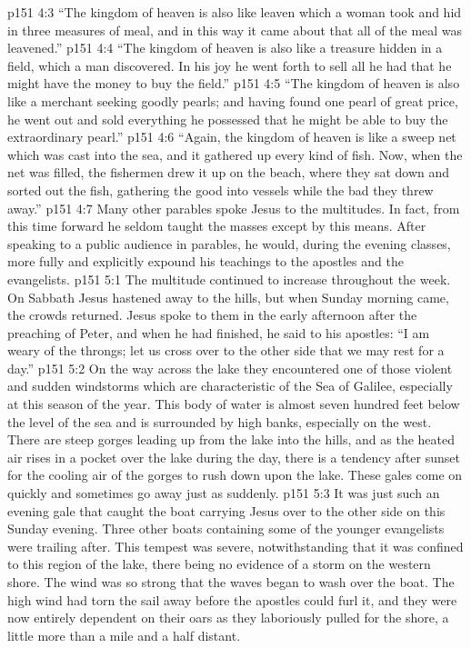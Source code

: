 \vs p151 4:3 \pc \textcolor{ubdarkred}{“The kingdom of heaven is also like leaven which a woman took and hid in three measures of meal, and in this way it came about that all of the meal was leavened.”}
\vs p151 4:4 \pc \textcolor{ubdarkred}{“The kingdom of heaven is also like a treasure hidden in a field, which a man discovered. In his joy he went forth to sell all he had that he might have the money to buy the field.”}
\vs p151 4:5 \pc \textcolor{ubdarkred}{“The kingdom of heaven is also like a merchant seeking goodly pearls; and having found one pearl of great price, he went out and sold everything he possessed that he might be able to buy the extraordinary pearl.”}
\vs p151 4:6 \pc \textcolor{ubdarkred}{“Again, the kingdom of heaven is like a sweep net which was cast into the sea, and it gathered up every kind of fish. Now, when the net was filled, the fishermen drew it up on the beach, where they sat down and sorted out the fish, gathering the good into vessels while the bad they threw away.”}
\vs p151 4:7 \pc Many other parables spoke Jesus to the multitudes. In fact, from this time forward he seldom taught the masses except by this means. After speaking to a public audience in parables, he would, during the evening classes, more fully and explicitly expound his teachings to the apostles and the evangelists.
\vs p151 5:1 The multitude continued to increase throughout the week. On Sabbath Jesus hastened away to the hills, but when Sunday morning came, the crowds returned. Jesus spoke to them in the early afternoon after the preaching of Peter, and when he had finished, he said to his apostles: \textcolor{ubdarkred}{“I am weary of the throngs; let us cross over to the other side that we may rest for a day.”}
\vs p151 5:2 On the way across the lake they encountered one of those violent and sudden windstorms which are characteristic of the Sea of Galilee, especially at this season of the year. This body of water is almost seven hundred feet below the level of the sea and is surrounded by high banks, especially on the west. There are steep gorges leading up from the lake into the hills, and as the heated air rises in a pocket over the lake during the day, there is a tendency after sunset for the cooling air of the gorges to rush down upon the lake. These gales come on quickly and sometimes go away just as suddenly.
\vs p151 5:3 It was just such an evening gale that caught the boat carrying Jesus over to the other side on this Sunday evening. Three other boats containing some of the younger evangelists were trailing after. This tempest was severe, notwithstanding that it was confined to this region of the lake, there being no evidence of a storm on the western shore. The wind was so strong that the waves began to wash over the boat. The high wind had torn the sail away before the apostles could furl it, and they were now entirely dependent on their oars as they laboriously pulled for the shore, a little more than a mile and a half distant.
